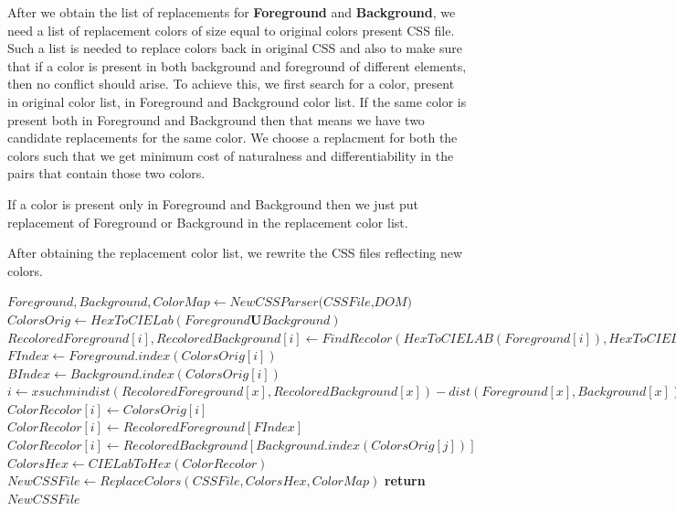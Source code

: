 After we obtain the list of replacements for \textbf{Foreground} and \textbf{Background}, we need a list of replacement colors of size equal to original colors present CSS file. Such a list is needed to replace colors back in original CSS and also to make sure that if a color is present in both background and foreground of different elements, then no conflict should arise. To achieve this, we first search for a color, present in original color list, in Foreground and Background color list. If the same color is present both in Foreground and Background then that means we have two candidate replacements for the same color. We choose a replacment for both the colors such that we get minimum cost of naturalness and differentiability in the pairs that contain those two colors. 

If a color is present only in Foreground and Background then we just put replacement of Foreground or Background in the replacement color list. 

After obtaining the replacement color list, we rewrite the CSS files reflecting new colors. 

\begin{algorithm}[!htb]
\caption{OurApproach}\label{Our Approach}
\begin{algorithmic}[1]
\State ${Foreground,Background,ColorMap} \gets \textit{NewCSSParser(CSSFile,DOM)}$
\State $ColorsOrig \gets HexToCIELab(Foreground \textbf{U} Background)$
	\State $RecoloredForeground[i], RecoloredBackground[i] \gets FindRecolor(HexToCIELAB(Foreground[i]),HexToCIELAB(Background[i]))$
\EndFor
{}
	 \State $FIndex \gets Foreground.index(ColorsOrig[i])$
			\State $BIndex \gets Background.index(ColorsOrig[i])$
	\State $i \gets x such min{dist(RecoloredForeground[x],RecoloredBackground[x])-dist(Foreground[x],Background[x])+ dist(RecoloredForeground[x],Foreground[x]),x \in{FIndex,BIndex} }$
			\State $ColorRecolor[i] \gets ColorsOrig[i]$
		\Else
		\State $ColorRecolor[i] \gets RecoloredForeground[FIndex]$
		\EndIf	
	\EndIf
	\State $ColorRecolor[i] \gets RecoloredBackground[Background.index(ColorsOrig[j])]$
\EndFor
\State $ColorsHex \gets CIELabToHex(ColorRecolor)$
\State $NewCSSFile \gets ReplaceColors(CSSFile, ColorsHex, ColorMap)$
\State \textbf{return} $NewCSSFile$
\EndProcedure
{}
\end{algorithmic}
\end{algorithm}


